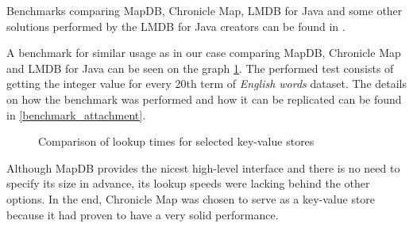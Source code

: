 Benchmarks comparing MapDB, Chronicle Map, LMDB for Java and some other solutions performed by the LMDB for Java creators
can be found in \citep{lmdb}.

A benchmark for similar usage as in our case comparing MapDB, Chronicle Map and LMDB for Java can be seen on the graph \ref{comp_maps}.
The performed test consists of getting the integer value for every 20th term of \textit{English words} dataset.
The details on how the benchmark was performed and how it can be replicated can be found in \ref{benchmark_attachment}.

\begin{figure}[htbp]
    \centering
    \caption{Comparison of lookup times for selected key-value stores}
    \label{comp_maps}
\end{figure}

Although MapDB provides the nicest high-level interface and there is no need to specify its size in advance,
its lookup speeds were lacking behind the other options.
In the end, Chronicle Map was chosen to serve as a key-value store because it had proven to have a very solid performance.

